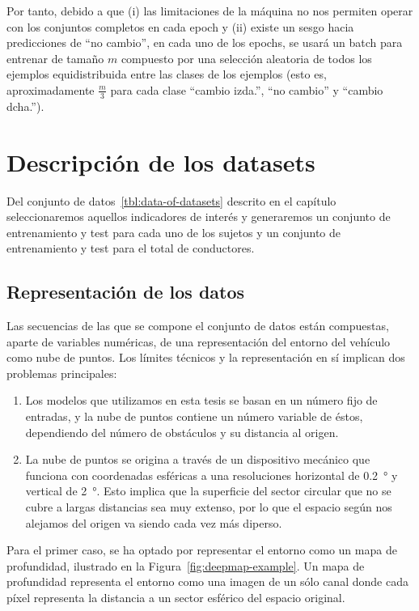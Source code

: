Por tanto, debido a que (i) las limitaciones de la máquina no nos permiten operar con los conjuntos completos en cada epoch y (ii) existe un sesgo hacia predicciones de \enquote{no cambio}, en cada uno de los epochs, se usará un batch para entrenar de tamaño $m$ compuesto por una selección aleatoria de todos los ejemplos equidistribuida entre las clases de los ejemplos (esto es, aproximadamente $\frac{m}{3}$ para cada clase \enquote{cambio izda.}, \enquote{no cambio} y \enquote{cambio dcha.}).

\section{Descripción de los datasets}

Del conjunto de datos~\ref{tbl:data-of-datasets} descrito en el capítulo~ seleccionaremos aquellos indicadores de interés y generaremos un conjunto de entrenamiento y test para cada uno de los sujetos y un conjunto de entrenamiento y test para el total de conductores.

\subsection{Representación de los datos}

Las secuencias de las que se compone el conjunto de datos están compuestas, aparte de variables numéricas, de una representación del entorno del vehículo como nube de puntos. Los límites técnicos y la representación en sí implican dos problemas principales:

\begin{enumerate}
	\item Los modelos que utilizamos en esta tesis se basan en un número fijo de entradas, y la nube de puntos contiene un número variable de éstos, dependiendo del número de obstáculos y su distancia al origen.
	\item La nube de puntos se origina a través de un dispositivo mecánico que funciona con coordenadas esféricas a una resoluciones horizontal de \SI{0.2}{\degree} y vertical de \SI{2}{\degree}. Esto implica que la superficie del sector circular que no se cubre a largas distancias sea muy extenso, por lo que el espacio según nos alejamos del origen va siendo cada vez más diperso.
\end{enumerate}

Para el primer caso, se ha optado por representar el entorno como un mapa de profundidad, ilustrado en la Figura~\ref{fig:deepmap-example}. Un mapa de profundidad representa el entorno como una imagen de un sólo canal donde cada píxel representa la distancia a un sector esférico del espacio original.


